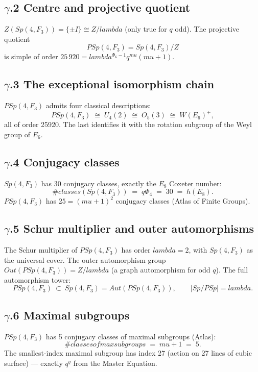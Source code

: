 \documentclass[12pt,a4paper]{article}
\def\mathbb#1{#1}%
\def\mathrm#1{#1}%
\def\textbf#1{#1}%
\def\text#1{#1}%
\def\lambda{lambda}%
\def\mu{mu}%
\def\Phi#1{Phi#1}%
\def\cdot{ }%
\theoremstyle{definition}
\newcommand{\Sp}{\mathrm{Sp}}
\newcommand{\PSp}{\mathrm{PSp}}
\newcommand{\FF}{\mathbb{F}}
\newcommand{\ZZ}{\mathbb{Z}}
\begin{document}
\subsection*{$\gamma$.2 \quad Centre and projective quotient}
$Z(\Sp(4,\FF_3)) = \{\pm I\} \cong \ZZ/\lambda$ (only true for $q$ odd).
The projective quotient
\[
\PSp(4,\FF_3) = \Sp(4,\FF_3)/Z
\]
is simple of order $25\,920 = \lambda^{\Phi_6 - 1}\cdot q^{\mu}\cdot(\mu+1)$.

\subsection*{$\gamma$.3 \quad The exceptional isomorphism chain}
$\PSp(4,\FF_3)$ admits four classical descriptions:
\[
\PSp(4,\FF_3) \;\cong\; \mathrm{U}_4(2) \;\cong\; \mathrm{O}_5(3) \;\cong\; W(E_6)^+,
\]
all of order 25920. The last identifies it with the rotation subgroup
of the Weyl group of $E_6$.

\subsection*{$\gamma$.4 \quad Conjugacy classes}
$\Sp(4,\FF_3)$ has \textbf{30 conjugacy classes}, exactly the
$E_8$ Coxeter number:
\[
\#\text{classes}(\Sp(4,\FF_3)) \;=\; q\Phi_4 \;=\; 30 \;=\; h(E_8).
\]
$\PSp(4,\FF_3)$ has $25 = (\mu+1)^2$ conjugacy classes
(Atlas of Finite Groups).

\subsection*{$\gamma$.5 \quad Schur multiplier and outer automorphisms}
The Schur multiplier of $\PSp(4,\FF_3)$ has order $\lambda=2$, with
$\Sp(4,\FF_3)$ as the universal cover. The outer automorphism group
$\mathrm{Out}(\PSp(4,\FF_3)) = \ZZ/\lambda$ (a graph automorphism for
odd $q$). The full automorphism tower:
\[
\PSp(4,\FF_3)\ \subset\ \Sp(4,\FF_3) = \mathrm{Aut}(\PSp(4,\FF_3)),
\qquad |\Sp/\PSp| = \lambda.
\]

\subsection*{$\gamma$.6 \quad Maximal subgroups}
$\PSp(4,\FF_3)$ has \textbf{5 conjugacy classes of maximal
subgroups} (Atlas):
\[
\#\text{classes of max subgroups} \;=\; \mu+1 \;=\; 5.
\]
The smallest-index maximal subgroup has index 27 (action on 27 lines
of cubic surface) — exactly $q^q$ from the Master Equation.
\end{document}

